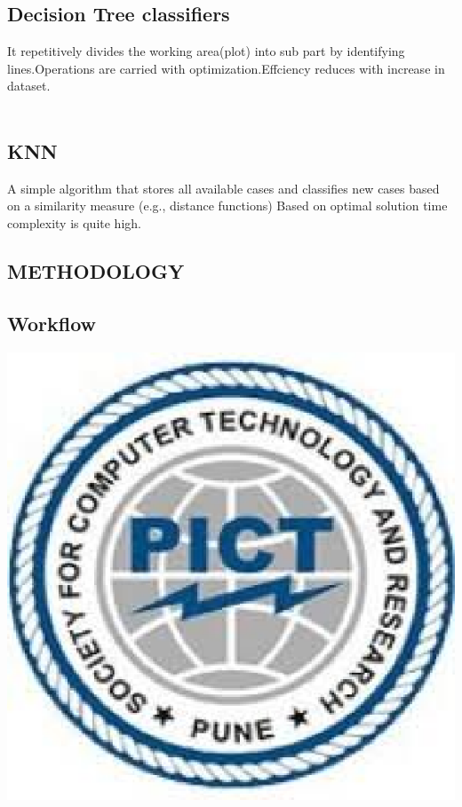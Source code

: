 \documentclass[a4paper, 12pt]{article}
\begin{document}
\subsection{Decision Tree classifiers}
\par
\hspace{1cm}
It repetitively divides
the working area(plot)
into sub part
by identifying
lines.Operations are
carried with
optimization.Effciency reduces
with increase
in dataset.
\\
\\


\subsection{KNN}
\par 
A simple algorithm
that stores
all available
cases and classifies
new cases
based on
a similarity
measure (e.g.,
distance functions)
Based on optimal
solution
time complexity
is quite
high.
\newpage
\begin{center}
\section{METHODOLOGY}

\end{center}
\subsection{Workflow}
\includegraphics[width=\linewidth]{pict}
\newpage
\end{document}
